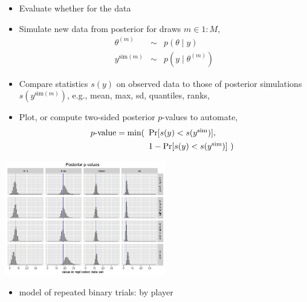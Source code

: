 \documentclass[10pt]{report}
\newcommand{\draw}[2]{#1^{(#2)}}
\newcommand{\simvar}[1]{#1^{\textrm{sim}}}
\newcommand{\simdraw}[2]{#1^{\textrm{sim}(#2)}}
\begin{document}
\begin{itemize}
\item Evaluate whether  for the data
\item Simulate new data from posterior for draws $m \in 1{:}M$,
  \begin{eqnarray*}
    \draw{\theta}{m} & \sim & p(\theta \mid y)
    \\
    \simdraw{y}{m} & \sim & p(y \mid \draw{\theta}{m})
  \end{eqnarray*}
\item Compare statistics $s(y)$ on observed data to those
  of posterior simulations $s(\simdraw{y}{m})$, e.g., mean, max, sd, quantiles, ranks,
\item Plot, or compute two-sided posterior $p$-values to automate,
  \[
    p\textrm{-value} = \min(\begin{array}[t]{l}
                              \textrm{Pr}[s(y) < s(\simvar{y})],
                              \\[4pt]
                              1 - \textrm{Pr}[s(y) < s(\simvar{y})] \ )
                              \end{array}
  \]
\end{itemize}

\begin{center}
\vspace*{-8pt}
\includegraphics[width=0.525\textwidth]{img/ppc-binary-trials.png}
\vspace*{-6pt}
\end{center}
\begin{itemize}
\item model of repeated binary trials:  by player
  \vspace*{-12pt}
\end{itemize}
\end{document}
